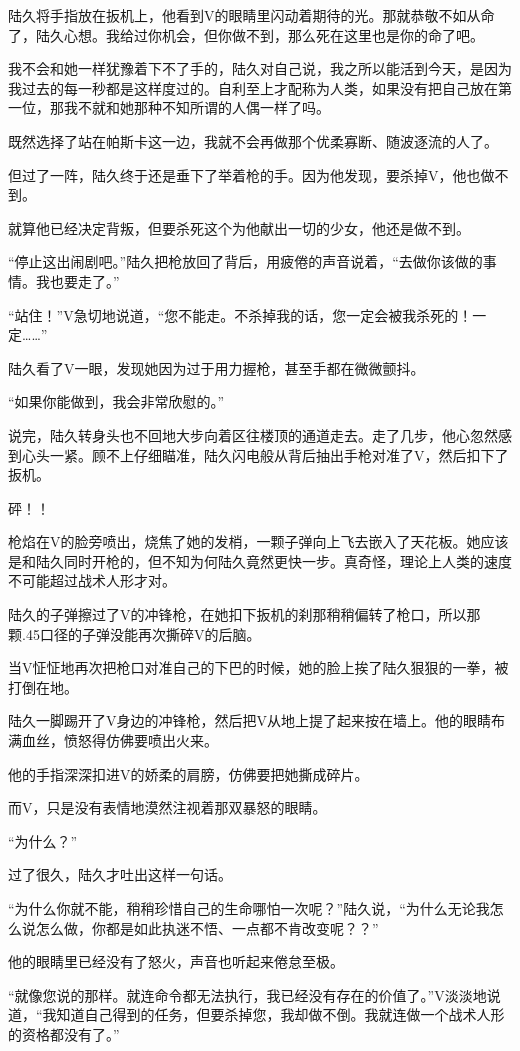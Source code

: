 陆久将手指放在扳机上，他看到V的眼睛里闪动着期待的光。那就恭敬不如从命了，陆久心想。我给过你机会，但你做不到，那么死在这里也是你的命了吧。

我不会和她一样犹豫着下不了手的，陆久对自己说，我之所以能活到今天，是因为我过去的每一秒都是这样度过的。自利至上才配称为人类，如果没有把自己放在第一位，那我不就和她那种不知所谓的人偶一样了吗。

既然选择了站在帕斯卡这一边，我就不会再做那个优柔寡断、随波逐流的人了。

但过了一阵，陆久终于还是垂下了举着枪的手。因为他发现，要杀掉V，他也做不到。

就算他已经决定背叛，但要杀死这个为他献出一切的少女，他还是做不到。

“停止这出闹剧吧。”陆久把枪放回了背后，用疲倦的声音说着，“去做你该做的事情。我也要走了。”

“站住！”V急切地说道，“您不能走。不杀掉我的话，您一定会被我杀死的！一定……”

陆久看了V一眼，发现她因为过于用力握枪，甚至手都在微微颤抖。

“如果你能做到，我会非常欣慰的。”

说完，陆久转身头也不回地大步向着区往楼顶的通道走去。走了几步，他心忽然感到心头一紧。顾不上仔细瞄准，陆久闪电般从背后抽出手枪对准了V，然后扣下了扳机。

砰！！

枪焰在V的脸旁喷出，烧焦了她的发梢，一颗子弹向上飞去嵌入了天花板。她应该是和陆久同时开枪的，但不知为何陆久竟然更快一步。真奇怪，理论上人类的速度不可能超过战术人形才对。

陆久的子弹擦过了V的冲锋枪，在她扣下扳机的刹那稍稍偏转了枪口，所以那颗.45口径的子弹没能再次撕碎V的后脑。

当V怔怔地再次把枪口对准自己的下巴的时候，她的脸上挨了陆久狠狠的一拳，被打倒在地。

陆久一脚踢开了V身边的冲锋枪，然后把V从地上提了起来按在墙上。他的眼睛布满血丝，愤怒得仿佛要喷出火来。

他的手指深深扣进V的娇柔的肩膀，仿佛要把她撕成碎片。

而V，只是没有表情地漠然注视着那双暴怒的眼睛。

“为什么？”

过了很久，陆久才吐出这样一句话。

“为什么你就不能，稍稍珍惜自己的生命哪怕一次呢？”陆久说，“为什么无论我怎么说怎么做，你都是如此执迷不悟、一点都不肯改变呢？？” 

他的眼睛里已经没有了怒火，声音也听起来倦怠至极。

“就像您说的那样。就连命令都无法执行，我已经没有存在的价值了。”V淡淡地说道，“我知道自己得到的任务，但要杀掉您，我却做不倒。我就连做一个战术人形的资格都没有了。”

